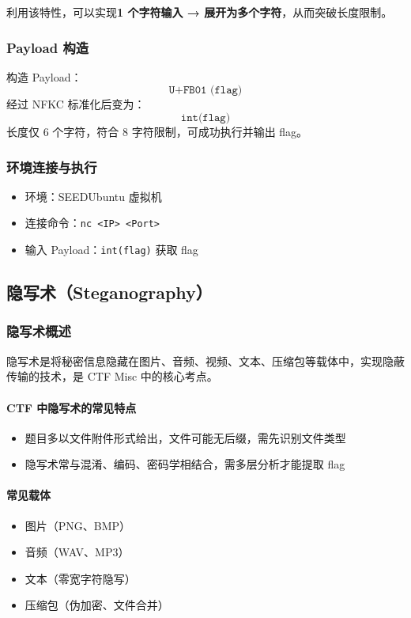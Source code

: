 利用该特性，可以实现\textbf{1 个字符输入 → 展开为多个字符}，从而突破长度限制。

\subsubsection{Payload 构造}
构造 Payload：
\[
\texttt{U+FB01 (flag)}
\]
经过 NFKC 标准化后变为：
\[
\texttt{int(flag)}
\]
长度仅 6 个字符，符合 8 字符限制，可成功执行并输出 flag。

\subsubsection{环境连接与执行}
\begin{itemize}[leftmargin=*]
    \item 环境：SEEDUbuntu 虚拟机
    \item 连接命令：\texttt{nc <IP> <Port>}
    \item 输入 Payload：\texttt{int(flag)} 获取 flag
\end{itemize}

\subsection{隐写术（Steganography）}
\label{subsec:misc_steganography_full}

\subsubsection{隐写术概述}
隐写术是将秘密信息隐藏在图片、音频、视频、文本、压缩包等载体中，实现隐蔽传输的技术，是 CTF Misc 中的核心考点。

\paragraph{CTF 中隐写术的常见特点}
\begin{itemize}[leftmargin=*]
    \item 题目多以文件附件形式给出，文件可能无后缀，需先识别文件类型
    \item 隐写术常与混淆、编码、密码学相结合，需多层分析才能提取 flag
\end{itemize}

\paragraph{常见载体}
\begin{itemize}[leftmargin=*]
    \item 图片（PNG、BMP）
    \item 音频（WAV、MP3）
    \item 文本（零宽字符隐写）
    \item 压缩包（伪加密、文件合并）
\end{itemize}


